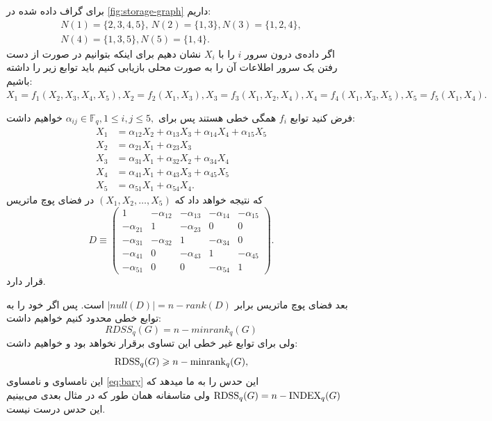  \begin{example}

 	برای گراف داده شده در
 	\ref{fig:storage-graph}
 	داریم:
 	\begin{align*}
 		N(1) = \{2,3,4,5\}, \, N(2)  = \{1,3\}, N(3)  = \{1,2,4\}, \\
 		N(4)  = \{1,3,5\},  N(5)  = \{1,4\}.
 	\end{align*}
 	اگر داده‌ی درون سرور
 	$i$
 	را با
 	$X_i$
 	نشان دهیم برای اینکه بتوانیم در صورت از دست رفتن یک سرور اطلاعات آن را به صورت محلی بازیابی کنیم باید توابع زیر را داشته باشیم:
 	$X_1 = f_1(X_2,X_3,X_4,X_5), X_2 = f_2(X_1,X_3), X_3 = f_3(X_1,X_2,X_4), X_4 = f_4(X_1,X_3, X_5), X_5 = f_5(X_1, X_4).$

 	فرض کنید توابع
 	$f_i$
 	همگی خطی هستند پس برای
 	$\alpha_{ij} \in  \mathbb{F}_q, 1\le i,j\le 5,$
 	خواهیم داشت:
 	 	\begin{align*}
 		X_1 &= \alpha_{12} X_2 +\alpha_{13} X_3 + \alpha_{14}X_4 + \alpha_{15}X_5\\
 		X_2 &= \alpha_{21}X_1+\alpha_{23}X_3\\
 		X_3 &= \alpha_{31}X_1 +\alpha_{32}X_2+\alpha_{34}X_4\\
 		X_4 &= \alpha_{41}X_1 + \alpha_{43}X_3 + \alpha_{45}X_5\\
 		X_5 &= \alpha_{51}X_1+\alpha_{54}X_4.
 	\end{align*}
 	که نتیجه خواهد داد که
 	$(X_1,X_2,\dots, X_5)$
 	در فضای پوچ ماتریس
 	\[
 	D \equiv
 	\left( \begin{array}{ccccc}
 		1 & -\alpha_{12} & -\alpha_{13}  & - \alpha_{14} & -\alpha_{15} \\
 		-\alpha_{21} & 1 &  -\alpha_{23} & 0 & 0 \\
 		-\alpha_{31} & -\alpha_{32} & 1 & -\alpha_{34} & 0\\
 		-\alpha_{41} & 0 &-\alpha_{43}  & 1 & -\alpha_{45}\\
 		-\alpha_{51} &0 & 0 & -\alpha_{54} & 1
 	\end{array} \right).\] 
 	قرار دارد.
 	
 	بعد فضای پوچ ماتریس برابر
 	$|null(D)| = n - rank(D)$
 	است. پس اگر خود را به توابع خطی محدود کنیم خواهیم داشت:
 	$$RDSS_q(G) = n - minrank_q(G)$$
 	ولی برای توابع غیر خطی این تساوی برقرار نخواهد بود و خواهیم داشت:
 	\begin{equation}
 		\mathrm{RDSS}_q(G) \geqslant n - \mathrm{minrank}_q(G),
 		\label{eq:minrk}
 	\end{equation}
 	این نامساوی و نامساوی
 	\ref{eq:bary}
 	این حدس را به ما میدهد که
 	$\mathrm{RDSS}_q(G) = n - \mathrm{INDEX}_q(G)$
 	ولی متاسفانه همان طور که در مثال بعدی می‌بینیم این حدس درست نیست.
 \end{example}
 
